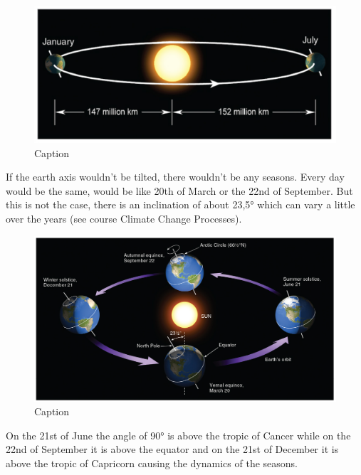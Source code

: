 \documentclass[12pt,oneside]{book}
\begin{document}
\begin{figure}

{\centering \includegraphics[width=1\linewidth]{figures/Figure22} 

}

\caption{Caption}\label{fig:Seasons2}
\end{figure}

If the earth axis wouldn't be tilted, there wouldn't be any seasons.
Every day would be the same, would be like 20th of March or the 22nd of
September. But this is not the case, there is an inclination of about
23,5° which can vary a little over the years (see course Climate Change
Processes).

\begin{figure}

{\centering \includegraphics[width=1\linewidth]{figures/Figure23} 

}

\caption{Caption}\label{fig:Seasons3}
\end{figure}

On the 21st of June the angle of 90° is above the tropic of Cancer while
on the 22nd of September it is above the equator and on the 21st of
December it is above the tropic of Capricorn causing the dynamics of the
seasons.
\end{document}
